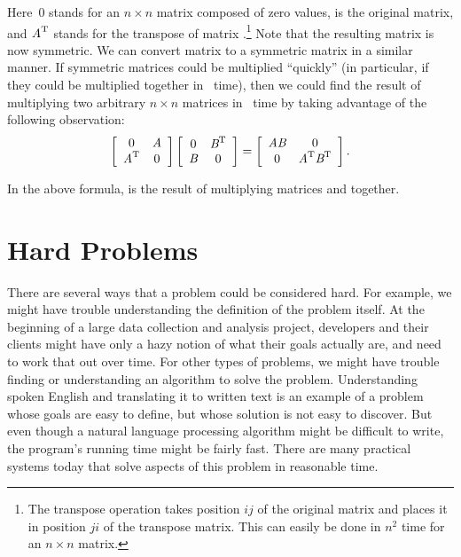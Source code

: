 \noindent
Here~0 stands for an \(n \times n\) matrix composed of zero values,
 is the original matrix, and \({\textit{A}}^{\rm T}\) stands for
the transpose of matrix .\footnote{The transpose operation
takes position \(ij\) of the original matrix and places it in position
\(ji\) of the transpose matrix.
This can easily be done in \(n^2\) time for an \(n \times n\) matrix.}
Note that the resulting matrix is now symmetric.
We can convert matrix  to a symmetric matrix in a similar
manner.
If symmetric matrices could be multiplied ``quickly'' (in particular,
if they could be multiplied together in \Thetantwo\ time), then we
could find the result of multiplying two arbitrary \(n \times n\)
matrices in \Thetantwo\ time by taking advantage of the following
observation:
\[
\left[
\begin{array}{cc}
0&{\textit{A}}\\
{\textit{A}}^{\rm T}&0
\end{array}
\right]
\left[
\begin{array}{cc}
0&{\textit{B}}^{\rm T}\\
{\textit{B}}&0
\end{array}
\right] =
\left[
\begin{array}{cc}
{\textit{AB}}&0\\
0&{\textit{A}}^{\rm T}{\textit{B}}^{\rm T}
\end{array}
\right].\]

\noindent In the above formula,  is the result of multiplying
matrices  and  together.

\section{Hard Problems}
\label{SecHardProb}

There are several ways that a problem could be considered hard.
For example, we might have trouble understanding the definition of the
problem itself.
At the beginning of a large data collection and analysis project,
developers and their clients might have only a hazy notion of what
their goals actually are, and need to work that out over time.
For other types of problems, we might have trouble finding or
understanding an algorithm to solve the problem.
Understanding spoken English and translating it to written text is an
example of a problem whose goals are easy to define, but whose
solution is not easy to discover.
But even though a natural language processing algorithm might be
difficult to write, the program's running time might be fairly fast.
There are many practical systems today that solve aspects of this
problem in reasonable time.


